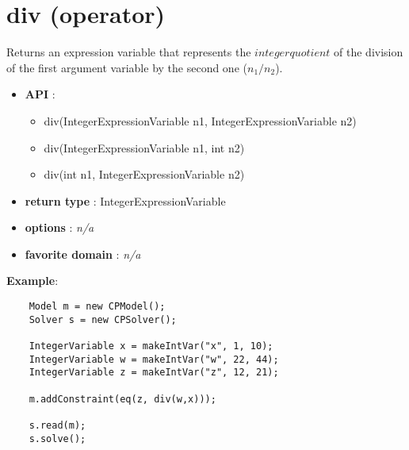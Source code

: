 \label{div}
\hypertarget{div}{}

\section{div (operator)}\label{div:divoperator}\hypertarget{div:divoperator}{}
Returns an expression variable that represents the \(integer quotient\) of the division of the first argument variable by the second one (\(n_1/n_2\)).

\begin{itemize}
	\item \textbf{API} :
	\begin{itemize}
		\item div(IntegerExpressionVariable n1, IntegerExpressionVariable n2)
		\item div(IntegerExpressionVariable n1, int n2)
		\item div(int n1, IntegerExpressionVariable n2)
	\end{itemize}
	\item \textbf{return type} : IntegerExpressionVariable
	\item \textbf{options} : \emph{n/a}
	\item \textbf{favorite domain} : \emph{n/a}
\end{itemize}

\textbf{Example}:
\begin{lstlisting}
	Model m = new CPModel();
	Solver s = new CPSolver();
	
	IntegerVariable x = makeIntVar("x", 1, 10);
	IntegerVariable w = makeIntVar("w", 22, 44);
	IntegerVariable z = makeIntVar("z", 12, 21);
	
	m.addConstraint(eq(z, div(w,x)));
	
	s.read(m);
	s.solve();
\end{lstlisting}
